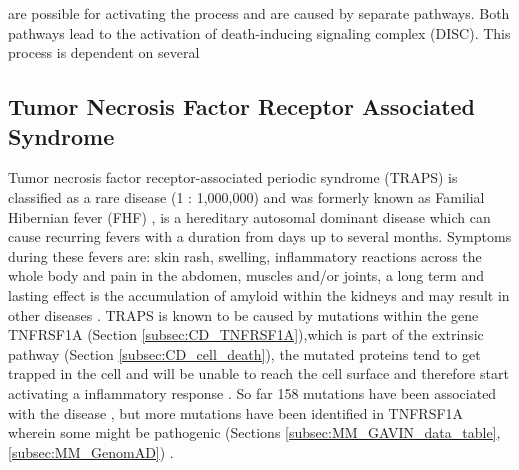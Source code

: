 %
%
%
%
%


 are possible for activating the process and are caused by separate pathways. 
Both pathways lead to the activation of death-inducing signaling complex (DISC). This process is dependent on several 
\label{subsec:CD_cell_death}

\subsection{Tumor Necrosis Factor Receptor Associated Syndrome}
Tumor necrosis factor receptor-associated periodic syndrome (TRAPS) is classified as a rare disease (1 : 1,000,000) and was formerly known as Familial Hibernian fever (FHF) \cite{}, is a hereditary autosomal dominant disease which can cause recurring fevers with a duration from days up to several months. Symptoms during these fevers are: skin rash, swelling, inflammatory reactions across the whole body and pain in the abdomen, muscles and/or joints, a long term and lasting effect is the accumulation of amyloid within the kidneys and may result in other diseases \cite{}. 
TRAPS is known to be caused by mutations within the gene TNFRSF1A (Section \ref{subsec:CD_TNFRSF1A}),which is part of the extrinsic pathway (Section \ref{subsec:CD_cell_death}), the mutated proteins tend to get trapped in the cell and will be unable to reach the cell surface and therefore start activating a inflammatory response \cite{}.
So far 158 mutations have been associated with the disease \cite{}, but more mutations have been identified in TNFRSF1A wherein some might be pathogenic (Sections \ref{subsec:MM_GAVIN_data_table}, \ref{subsec:MM_GenomAD}) .
\label{subsec:CD_TRAPS}

